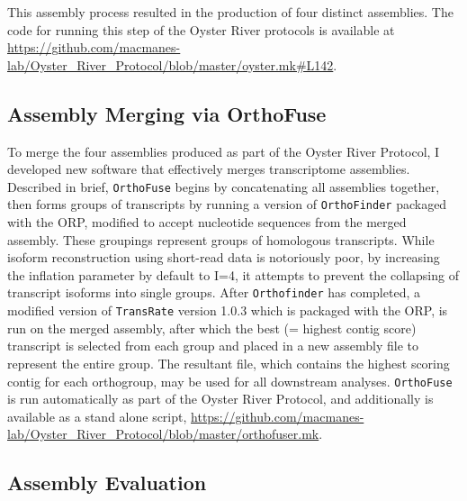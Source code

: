 \documentclass[10pt,letterpaper]{article}
\begin{document}
This assembly process resulted in the production of four distinct assemblies. The code for running this step of the Oyster River protocols is available at \url{https://github.com/macmanes-lab/Oyster_River_Protocol/blob/master/oyster.mk#L142}.  
 

\subsection{Assembly Merging via OrthoFuse}

To merge the four assemblies produced as part of the Oyster River Protocol, I developed new software that effectively merges transcriptome assemblies. Described in brief, \texttt{OrthoFuse} begins by concatenating all assemblies together, then forms groups of transcripts by running a version of \texttt{OrthoFinder} \cite{Emms:2015iga} packaged with the ORP, modified to accept nucleotide sequences from the merged assembly. These groupings represent groups of homologous transcripts. While isoform reconstruction using short-read data is notoriously poor, by increasing the inflation parameter by default to I=4, it attempts to prevent the collapsing of transcript isoforms into single groups. After \texttt{Orthofinder} has completed, a modified version of \texttt{TransRate} version 1.0.3 \cite{SmithUnna:2016go} which is packaged with the ORP, is run on the merged assembly, after which the best (= highest contig score) transcript is selected from each group and placed in a new assembly file to represent the entire group. The resultant file, which contains the highest scoring contig for each orthogroup, may be used for all downstream analyses. \texttt{OrthoFuse} is run automatically as part of the Oyster River Protocol, and additionally is available as a stand alone script, \url{https://github.com/macmanes-lab/Oyster_River_Protocol/blob/master/orthofuser.mk}. 

\subsection{Assembly Evaluation}
\end{document}
